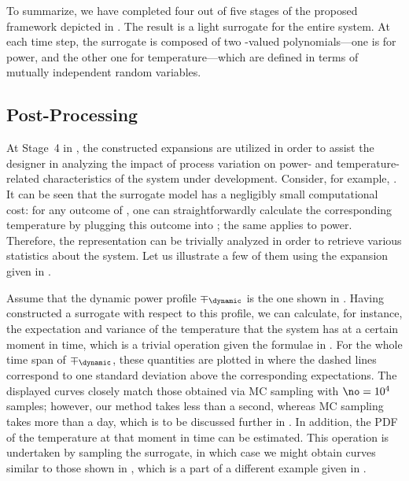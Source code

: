 To summarize, we have completed four out of five stages of the proposed
framework depicted in . The result is a light surrogate for
the entire system. At each time step, the surrogate is composed of two
\np-valued polynomials---one is for power, and the other one for
temperature---which are defined in terms of \nz mutually independent random
variables.

\subsection{Post-Processing}

At Stage~4 in , the constructed expansions are utilized in
order to assist the designer in analyzing the impact of process variation on
power- and temperature-related characteristics of the system under development.
Consider, for example, . It can be seen that the
surrogate model has a negligibly small computational cost: for any outcome of
\vz, one can straightforwardly calculate the corresponding temperature by
plugging this outcome into ; the same applies to
power. Therefore, the representation can be trivially analyzed in order to
retrieve various statistics about the system. Let us illustrate a few of them
using the expansion given in .

Assume that the dynamic power profile $\mp_\dynamic$ is the one shown in
. Having constructed a surrogate with respect to
this profile, we can calculate, for instance, the expectation and variance of
the temperature that the system has at a certain moment in time, which is a
trivial operation given the formulae in . For the whole time
span of $\mp_\dynamic$, these quantities are plotted in
 where the dashed lines correspond to one
standard deviation above the corresponding expectations. The displayed curves
closely match those obtained via \ac{MC} sampling with $\no = 10^4$ samples;
however, our method takes less than a second, whereas \ac{MC} sampling takes
more than a day, which is to be discussed further in
. In addition, the \ac{PDF} of the temperature at
that moment in time can be estimated. This operation is undertaken by sampling
the surrogate, in which case we might obtain curves similar to those shown in
, which is a part of a different example given
in .

